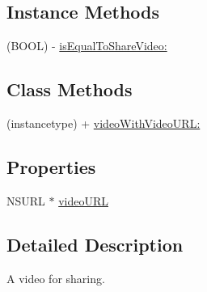 \subsection*{Instance Methods}
\begin{DoxyCompactItemize}
\item 
(B\-O\-O\-L) -\/ \hyperlink{interface_f_b_s_d_k_share_video_aa328b40045977254ccd5d3c022f2c4eb}{is\-Equal\-To\-Share\-Video\-:}
\end{DoxyCompactItemize}
\subsection*{Class Methods}
\begin{DoxyCompactItemize}
\item 
(instancetype) + \hyperlink{interface_f_b_s_d_k_share_video_ac6de38c3ee95b53f9cc0062e7f784923}{video\-With\-Video\-U\-R\-L\-:}
\end{DoxyCompactItemize}
\subsection*{Properties}
\begin{DoxyCompactItemize}
\item 
N\-S\-U\-R\-L $\ast$ \hyperlink{interface_f_b_s_d_k_share_video_afdccd7554a53514993ba881300edecc5}{video\-U\-R\-L}
\end{DoxyCompactItemize}


\subsection{Detailed Description}
A video for sharing. 

